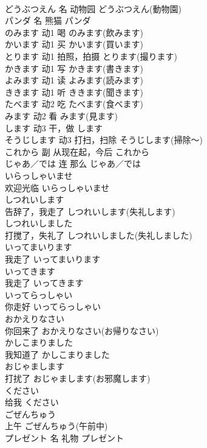 \documentclass[8pt]{extreport}
\begin{document}
\begin{CJK}{UTF8}{min}
\\	どうぶつえん	名	动物园	どうぶつえん(動物園)	
\\	パンダ	名	熊猫	パンダ	
\\	のみます	动1	喝	のみます(飲みます)	
\\	かいます	动1	买	かいます(買います)	
\\	とります	动1	拍照，拍摄	とります(撮ります)	
\\	かきます	动1	写	かきます(書きます)	
\\	よみます	动1	读	よみます(読みます)	
\\	ききます	动1	听	ききます(聞きます)	
\\	たべます	动2	吃	たべます(食べます)	
\\	みます	动2	看	みます(見ます)	
\\	します	动3	干，做	します	
\\	そうじします	动3	打扫，扫除	そうじします(掃除～)	
\\	これから	副	从现在起，今后	これから	
\\	じゃあ／では	连	那么	じゃあ／では	
\\	いらっしゃいませ	
\\	欢迎光临	いらっしゃいませ	
\\	しつれいします	
\\	告辞了，我走了	しつれいします(失礼します)	
\\	しつれいしました	
\\	打搅了，失礼了	しつれいしました(失礼しました)	
\\	いってまいります	
\\	我走了	いってまいります	
\\	いってきます	
\\	我走了	いってきます	
\\	いってらっしゃい	
\\	你走好	いってらっしゃい	
\\	おかえりなさい	
\\	你回来了	おかえりなさい(お帰りなさい)	
\\	かしこまりました	
\\	我知道了	かしこまりました	
\\	おじゃまします	
\\	打扰了	おじゃまします(お邪魔します)	
\\	ください	
\\	给我	ください	
\\	ごぜんちゅう	
\\	上午	ごぜんちゅう(午前中)	
\\	プレゼント	名	礼物	プレゼント	

\end{CJK}
\end{document}

